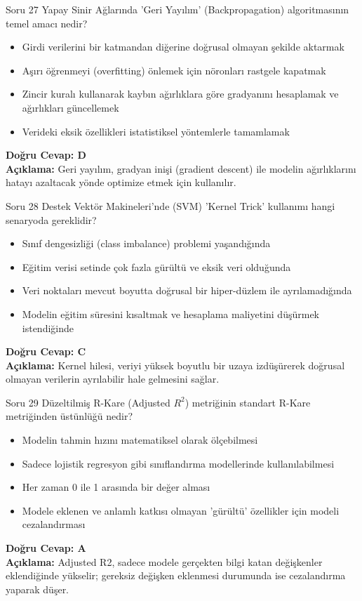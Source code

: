 \documentclass[12pt,a4paper]{article}
\begin{document}
\begin{testcard}{Soru 27}
    Yapay Sinir Ağlarında 'Geri Yayılım' (Backpropagation) algoritmasının temel amacı nedir?
    \begin{itemize}
        \item[A)] Girdi verilerini bir katmandan diğerine doğrusal olmayan şekilde aktarmak
        \item[B)] Aşırı öğrenmeyi (overfitting) önlemek için nöronları rastgele kapatmak
        \item[C)] Zincir kuralı kullanarak kaybın ağırlıklara göre gradyanını hesaplamak ve ağırlıkları güncellemek
        \item[D)] Verideki eksik özellikleri istatistiksel yöntemlerle tamamlamak
    \end{itemize}
    \tcblower
    \textbf{Doğru Cevap: D} \\
    \textbf{Açıklama:} Geri yayılım, gradyan inişi (gradient descent) ile modelin ağırlıklarını hatayı azaltacak yönde optimize etmek için kullanılır.
\end{testcard}

\begin{testcard}{Soru 28}
    Destek Vektör Makineleri'nde (SVM) 'Kernel Trick' kullanımı hangi senaryoda gereklidir?
    \begin{itemize}
        \item[A)] Sınıf dengesizliği (class imbalance) problemi yaşandığında
        \item[B)] Eğitim verisi setinde çok fazla gürültü ve eksik veri olduğunda
        \item[C)] Veri noktaları mevcut boyutta doğrusal bir hiper-düzlem ile ayrılamadığında
        \item[D)] Modelin eğitim süresini kısaltmak ve hesaplama maliyetini düşürmek istendiğinde
    \end{itemize}
    \tcblower
    \textbf{Doğru Cevap: C} \\
    \textbf{Açıklama:} Kernel hilesi, veriyi yüksek boyutlu bir uzaya izdüşürerek doğrusal olmayan verilerin ayrılabilir hale gelmesini sağlar.
\end{testcard}

\begin{testcard}{Soru 29}
    Düzeltilmiş R-Kare (Adjusted $R^2$) metriğinin standart R-Kare metriğinden üstünlüğü nedir?
    \begin{itemize}
        \item[A)] Modelin tahmin hızını matematiksel olarak ölçebilmesi
        \item[B)] Sadece lojistik regresyon gibi sınıflandırma modellerinde kullanılabilmesi
        \item[C)] Her zaman 0 ile 1 arasında bir değer alması
        \item[D)] Modele eklenen ve anlamlı katkısı olmayan 'gürültü' özellikler için modeli cezalandırması
    \end{itemize}
    \tcblower
    \textbf{Doğru Cevap: A} \\
    \textbf{Açıklama:} Adjusted R2, sadece modele gerçekten bilgi katan değişkenler eklendiğinde yükselir; gereksiz değişken eklenmesi durumunda ise cezalandırma yaparak düşer.
\end{testcard}
\end{document}
